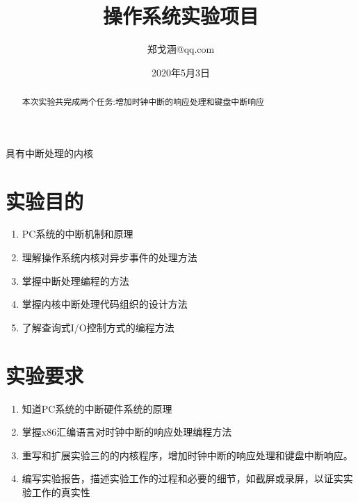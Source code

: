 \documentclass[a4paper, 11pt]{article} %
\title{\textbf{操作系统实验项目}\\ %
} %
\author{郑戈涵\quad 17338233\quad 931252924@qq.com} %
\date{2020年5月3日} %
\makeatletter
\renewcommand{\maketitle}{ %
\begin{center} %
{\LARGE\@title} %

\large{\@subtitle}

\vspace{1em} %

{\large\@author} %

\end{center}
}
\newcommand\@subtitle{具有中断处理的内核}
\makeatother
\begin{document}
\maketitle %


\renewcommand{\abstractname}{摘要} %

\begin{abstract}
  本次实验共完成两个任务:增加时钟中断的响应处理和键盘中断响应
\end{abstract}


\vspace{1em} %

\setcounter{tocdepth}{2}
\renewcommand{\contentsname}{目录}
\tableofcontents


\pagebreak

\section{实验目的}

\begin{enumerate}
  \item PC系统的中断机制和原理
  \item 理解操作系统内核对异步事件的处理方法
  \item 掌握中断处理编程的方法
  \item 掌握内核中断处理代码组织的设计方法
  \item 了解查询式I/O控制方式的编程方法
\end{enumerate}


\section{实验要求}

\begin{enumerate}
  \item 知道PC系统的中断硬件系统的原理
  \item 掌握x86汇编语言对时钟中断的响应处理编程方法
  \item 重写和扩展实验三的的内核程序，增加时钟中断的响应处理和键盘中断响应。
  \item 编写实验报告，描述实验工作的过程和必要的细节，如截屏或录屏，以证实实验工作的真实性
\end{enumerate}
\end{document}
